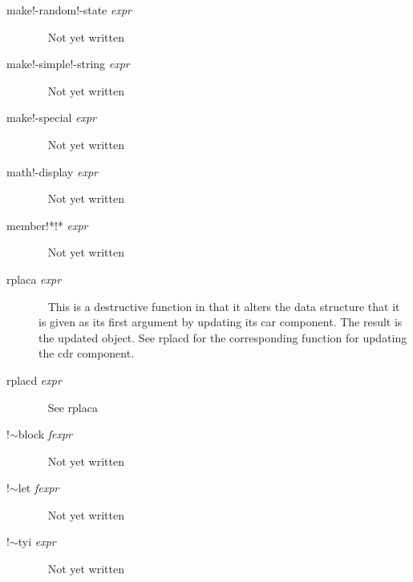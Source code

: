 \documentclass[a4paper,11pt]{article}
\begin{document}
\begin{description}
\item [{\ttfamily make!-random!-state} {\itshape  expr}]  ~\newline
Not yet written

\item [{\ttfamily make!-simple!-string} {\itshape  expr}]  ~\newline
Not yet written

\item [{\ttfamily make!-special} {\itshape  expr}]  ~\newline
Not yet written

\item [{\ttfamily math!-display} {\itshape  expr}]  ~\newline
Not yet written

\item [{\ttfamily member!*!*} {\itshape  expr}]  ~\newline
Not yet written

\item[{\ttfamily rplaca} {\itshape expr}]  ~\newline
This is a destructive function in that it alters the data structure
that it is given as its first argument by updating its {\ttfamily car}
component. The result is the updated object. See {\ttfamily rplacd}
for the corresponding function for updating the {\ttfamily cdr} component.

\item [{\ttfamily rplacd} {\itshape expr}]  ~\newline
See {\ttfamily rplaca}

\item [{\ttfamily !$\sim$block} {\itshape  fexpr}]  ~\newline
Not yet written

\item [{\ttfamily !$\sim$let} {\itshape  fexpr}]  ~\newline
Not yet written

\item [{\ttfamily !$\sim$tyi} {\itshape  expr}]  ~\newline
Not yet written

\end{description} %

\printindex
\end{document}
